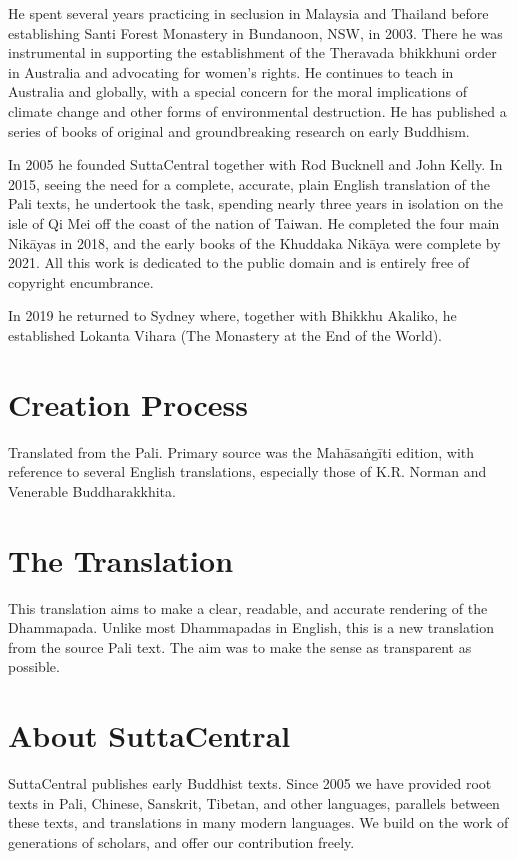 \documentclass[12pt,openany]{book}%
\begin{document}
He spent several years practicing in seclusion in Malaysia and Thailand before establishing Santi Forest Monastery in Bundanoon, NSW, in 2003. There he was instrumental in supporting the establishment of the Theravada bhikkhuni order in Australia and advocating for women’s rights. He continues to teach in Australia and globally, with a special concern for the moral implications of climate change and other forms of environmental destruction. He has published a series of books of original and groundbreaking research on early Buddhism. 

In 2005 he founded SuttaCentral together with Rod Bucknell and John Kelly. In 2015, seeing the need for a complete, accurate, plain English translation of the Pali texts, he undertook the task, spending nearly three years in isolation on the isle of Qi Mei off the coast of the nation of Taiwan. He completed the four main \textsanskrit{Nikāyas} in 2018, and the early books of the Khuddaka \textsanskrit{Nikāya} were complete by 2021. All this work is dedicated to the public domain and is entirely free of copyright encumbrance. 

In 2019 he returned to Sydney where, together with Bhikkhu Akaliko, he established Lokanta Vihara (The Monastery at the End of the World). 

\section*{Creation Process}

Translated from the Pali. Primary source was the \textsanskrit{Mahāsaṅgīti} edition, with reference to several English translations, especially those of K.R. Norman and Venerable Buddharakkhita.

\section*{The Translation}

This translation aims to make a clear, readable, and accurate rendering of the Dhammapada. Unlike most Dhammapadas in English, this is a new translation from the source Pali text. The aim was to make the sense as transparent as possible.

\section*{About SuttaCentral}

SuttaCentral publishes early Buddhist texts. Since 2005 we have provided root texts in Pali, Chinese, Sanskrit, Tibetan, and other languages, parallels between these texts, and translations in many modern languages. We build on the work of generations of scholars, and offer our contribution freely.
\end{document}
